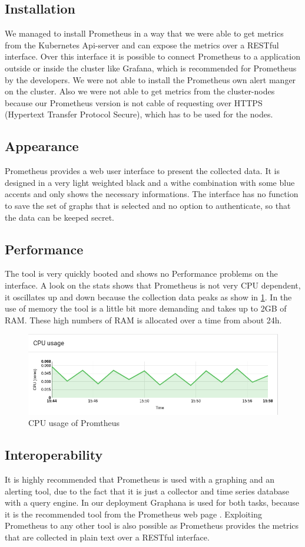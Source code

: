 \subsection{Installation}
We managed to install Prometheus in a way that we were able to get metrics from the  Kubernetes Api-server and can expose the metrics over a RESTful interface. Over this interface it is possible to connect Prometheus to a application outside or inside the cluster like Grafana, which is recommended for Prometheus by the developers. We were not able to install the Prometheus own alert manger on the cluster. Also we were not able to get metrics from the cluster-nodes because our Prometheus version is not cable of requesting over HTTPS (Hypertext Transfer Protocol Secure), which has to be used for the nodes. 
\subsection{Appearance}%
Prometheus provides a web user interface to present the collected data. It is designed in a very light weighted black and a withe combination with some blue accents and only shows the necessary informations. The interface has no function to save the set of graphs that is selected and no option to authenticate, so that the data can be keeped secret. 
\subsection{Performance}
The tool is very quickly booted and shows no Performance problems on the interface. A look on the stats shows that Prometheus is not very CPU dependent, it oscillates up and down because the collection data peaks as show in \cref{fig:Prometeus_Cpu}. In the use of memory the tool is a little bit more demanding and takes up to 2GB of RAM. These high numbers of RAM is allocated over a time from about 24h. 
\begin{figure}
\centering
\includegraphics[width=0.5\linewidth]{Bilder/Performance/Prometeus_Cpu}
\caption{CPU usage of Promtheus}
\label{fig:Prometeus_Cpu}
\end{figure}
\subsection{Interoperability}
It is highly recommended that Prometheus is used with a graphing and an alerting tool, due to the fact that it is just a collector and time series database with a query engine. In our deployment Graphana is used for both tasks, because it is the recommended tool from the Prometheus web page \cite{prometheus}. Exploiting Prometheus to any other tool is also possible as Prometheus provides the metrics that are collected in plain text over a RESTful interface.
